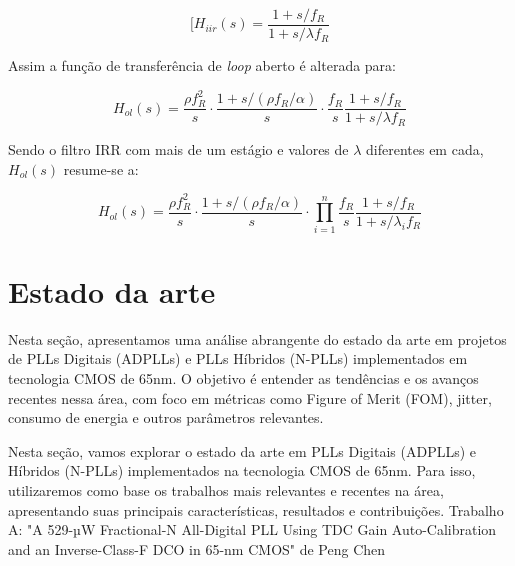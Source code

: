 	\begin{equation}
	[H_{iir}(s) = \frac{ 1 + s/f_R}{ 1 + s/\lambda f_R}
	\label{eq:irr_s_domain}
	\end{equation}
	
Assim a função de transferência de \textit{loop} aberto é alterada para:


\begin{equation}
	H_{ol}(s) = \frac{\rho f_R^2}{s} \cdot \frac{1 + s/(\rho f_R / \alpha)}{s} \cdot \frac{f_R}{s} \frac{ 1 + s/f_R}{ 1 + s/\lambda f_R}
	\label{eq:hol_irr_simgle}
\end{equation}


Sendo o filtro IRR com mais de um estágio e valores de $\lambda$ diferentes em cada,  $H_{ol}(s)$ resume-se a:

\begin{equation}
H_{ol}(s) = \frac{\rho f_R^2}{s} \cdot \frac{1 + s/(\rho f_R / \alpha)}{s} \cdot \prod_{i=1}^{n} \frac{f_R}{s} \frac{ 1 + s/f_R}{ 1 + s/\lambda_i f_R}
	\label{eq:hol_irr_cascade}
\end{equation}


\section{Estado da arte}

Nesta seção, apresentamos uma análise abrangente do estado da arte em projetos de PLLs Digitais (ADPLLs) e PLLs Híbridos (N-PLLs) implementados em tecnologia CMOS de 65nm. O objetivo é entender as tendências e os avanços recentes nessa área, com foco em métricas como Figure of Merit (FOM), jitter, consumo de energia e outros parâmetros relevantes.


Nesta seção, vamos explorar o estado da arte em PLLs Digitais (ADPLLs) e Híbridos (N-PLLs) implementados na tecnologia CMOS de 65nm. Para isso, utilizaremos como base os trabalhos mais relevantes e recentes na área, apresentando suas principais características, resultados e contribuições.
Trabalho A: "A 529-µW Fractional-N All-Digital PLL Using TDC Gain Auto-Calibration and an Inverse-Class-F DCO in 65-nm CMOS" de Peng Chen

